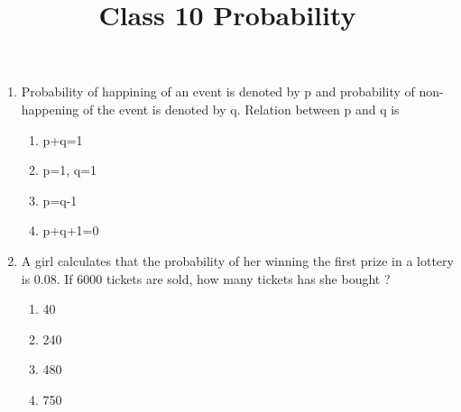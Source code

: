 \documentclass{article}
\begin{document}
\title{Class 10 Probability}
\maketitle
\LARGE
\begin{enumerate}
	\item Probability of happining of an event is denoted by p and probability of non-happening of the event is denoted by q. Relation between p and q is 
			\begin{enumerate}
				\item p+q=1
				\item p=1, q=1
				\item p=q-1
				\item p+q+1=0
			\end{enumerate}
	\item A girl calculates that the probability of her winning the first prize in a lottery is 0.08. If 6000 tickets are sold, how many tickets has she bought ?
			\begin{enumerate}
				\item  40
				\item  240
				\item  480
				\item  750


\end{enumerate}
\end{enumerate}
\end{document}
